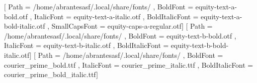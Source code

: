 %
%
%


\ifxetex
  \usepackage[tuenc]{fontspec}
  \setmainfont{equity-text-a-regular.otf}[
    Path           = /home/abrantesasf/.local/share/fonts/ ,
    BoldFont       = equity-text-a-bold.otf                ,
    ItalicFont     = equity-text-a-italic.otf              ,
    BoldItalicFont = equity-text-a-bold-italic.otf         ,
    SmallCapsFont  = equity-caps-a-regular.otf]
  \setsansfont{equity-text-b-regular.otf}[
    Path           = /home/abrantesasf/.local/share/fonts/ ,
    BoldFont       = equity-text-b-bold.otf                ,
    ItalicFont     = equity-text-b-italic.otf              ,
    BoldItalicFont = equity-text-b-bold-italic.otf]      
  \setmonofont{courier_prime.ttf}[
    Path           = /home/abrantesasf/.local/share/fonts/ ,
    BoldFont       = courier_prime_bold.ttf                ,
    ItalicFont     = courier_prime_italic.ttf              ,
    BoldItalicFont = courier_prime_bold_italic.ttf]
  \usepackage{fontawesome5}
\else
  \usepackage[T1]{fontenc}
  \usepackage[utf8]{inputenc}
  \usepackage{lmodern}
\fi
